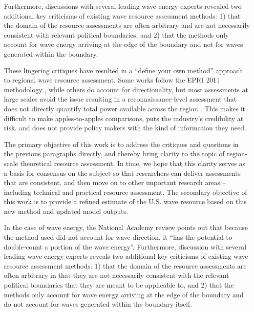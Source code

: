 


Furthermore, discussions with several leading wave energy experts revealed two additional key criticisms of existing wave resource assessment methods: 1) that the domain of the resource assessments are often arbitrary and are not necessarily consistent with relevant political boundaries, and 2) that the methods only account for wave energy arriving at the edge of the boundary and not for waves generated within the boundary.

These lingering critiques have resulted in a “define your own method” approach to regional wave resource assessment. Some works follow the EPRI 2011 methodology , while others do account for directionality, but most assessments at large scales avoid the issue resulting in a reconnaissance-level assessment that does not directly quantify total power available across the region . This makes it difficult to make apples-to-apples comparisons, puts the industry’s credibility at risk, and does not provide policy makers with the kind of information they need. 

The primary objective of this work is to address the critiques and questions in the previous paragraphs directly, and thereby bring clarity to the topic of region-scale theoretical resource assessment. In time, we hope that this clarity serves as a basis for consensus on the subject so that researchers can deliver assessments that are consistent, and then move on to other important research areas – including technical and practical resource assessment. The secondary objective of this work is to provide a refined estimate of the U.S. wave resource based on this new method and updated model outputs.

In the case of wave energy, the National Academy review points out that
because the method used did not account for wave direction, it ``has the
potential to double-count a portion of the wave energy''. Furthermore, discussion with several leading wave energy experts reveals two additional key criticisms of existing wave resource assessment methods: 1) that the domain of the resource assessments are often arbitrary in that they are not necessarily consistent with the relevant political boundaries that they are meant to be applicable to, and 2) that the methods only account for wave energy arriving at the edge of the boundary and do not account for waves generated within the boundary itself.

